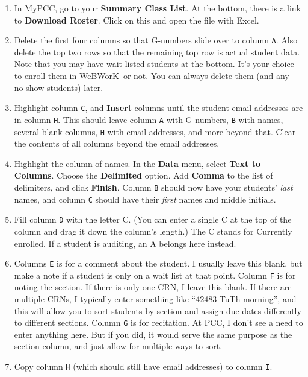 \documentclass[12pt]{article}
\newcommand{\menu}[1]{\textbf{#1}}
\newcommand{\WW}{WeBWorK}
\begin{document}
\begin{enumerate}
	\item In MyPCC, go to your \menu{Summary Class List}.
	      At the bottom, there is a link to \menu{Download Roster}.
	      Click on this and open the file with Excel.
	\item Delete the first four columns so that G-numbers slide over to column \texttt{A}.
	      Also delete the top two rows so that the remaining top row is actual student data.
	      Note that you may have wait-listed students at the bottom.
	      It's your choice to enroll them in \WW\ or not.
	      You can always delete them (and any no-show students) later.
	\item Highlight column \texttt{C}, and \menu{Insert} columns until the student email addresses are in column \texttt{H}.
	      This should leave column \texttt{A} with G-numbers, \texttt{B} with names, several blank columns, \texttt{H} with email addresses, and more beyond that.
	      Clear the contents of all columns beyond the email addresses.
	\item Highlight the column of names.
	      In the \menu{Data} menu, select \menu{Text to Columns}.
	      Choose the \menu{Delimited} option.
	      Add \menu{Comma} to the list of delimiters, and click \menu{Finish}.
	      Column \texttt{B} should now have your students' \emph{last} names, and column \texttt{C} should have their \emph{first} names and middle initials.
	\item Fill column \texttt{D} with the letter C.
	      (You can enter a single C at the top of the column and drag it down the column's length.) The C stands for Currently enrolled.
	      If a student is auditing, an A belongs here instead.
	\item Columns \texttt{E} is for a comment about the student.
	      I usually leave this blank, but make a note if a student is only on a wait list at that point.
	      Column \texttt{F} is for noting the section.
	      If there is only one CRN, I leave this blank.
	      If there are multiple CRNs, I typically enter something like ``42483 TuTh morning'', and this will allow you to sort students by section and assign due dates differently to different sections.
	      Column \texttt{G} is for recitation.
	      At PCC, I don't see a need to enter anything here.
	      But if you did, it would serve the same purpose as the section column, and just allow for multiple ways to sort.
	\item Copy column \texttt{H} (which should still have email addresses) to column \texttt{I}.

\end{enumerate}
\end{document}
